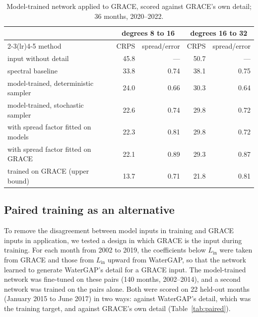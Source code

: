 \documentclass[11pt,a4paper]{article}
\begin{document}
\begin{table}[ht]
\centering\small
\caption{Model-trained network applied to GRACE, scored against GRACE's own detail; 36 months,
2020--2022.}
\label{tab:g1}
\begin{tabular}{lrrrr}
  \toprule
  & \multicolumn{2}{c}{degrees 8 to 16} & \multicolumn{2}{c}{degrees 16 to 32} \\
  \cmidrule(lr){2-3}\cmidrule(lr){4-5}
  method & CRPS & spread/error & CRPS & spread/error \\
  \midrule
  input without detail & 45.8 & --- & 50.7 & --- \\
  spectral baseline & 33.8 & 0.74 & 38.1 & 0.75 \\
  model-trained, deterministic sampler & 24.0 & 0.66 & 30.3 & 0.64 \\
  model-trained, stochastic sampler & 22.6 & 0.74 & 29.8 & 0.72 \\
  \quad with spread factor fitted on models & 22.3 & 0.81 & 29.8 & 0.72 \\
  \quad with spread factor fitted on GRACE & 22.1 & 0.89 & 29.3 & 0.87 \\
  \midrule
  trained on GRACE (upper bound) & 13.7 & 0.71 & 21.8 & 0.81 \\
  \bottomrule
\end{tabular}
\end{table}

\subsection{Paired training as an alternative}\label{sec:paired}
To remove the disagreement between model inputs in training and GRACE inputs in application,
we tested a design in which GRACE is the input during training. For each month from 2002 to
2019, the coefficients below $L_\mathrm{in}$ were taken from GRACE and those from
$L_\mathrm{in}$ upward from WaterGAP, so that the network learned to generate WaterGAP's
detail for a GRACE input. The model-trained network was fine-tuned on these pairs (140 months,
2002--2014), and a second network was trained on the pairs alone. Both were scored on 22
held-out months (January 2015 to June 2017) in two ways: against WaterGAP's detail, which was
the training target, and against GRACE's own detail (Table~\ref{tab:paired}).
\end{document}
